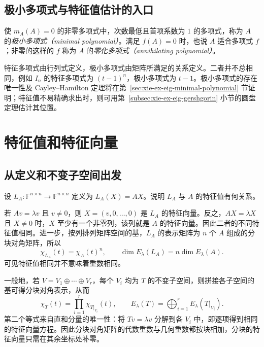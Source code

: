 \subsection{极小多项式与特征值估计的入口}

\begin{definition}
使 $m_A(A)=0$ 的非零多项式中，次数最低且首项系数为 $1$ 的多项式，称为 $A$ 的\emph{极小多项式（minimal polynomial）}。满足 $f(A)=0$ 时，也说 $A$ 适合多项式 $f$；非零的这样的 $f$ 称为 $A$ 的\emph{零化多项式（annihilating polynomial）}。
\end{definition}

特征多项式由行列式定义，极小多项式由矩阵所满足的关系定义。二者并不总相同，例如 $I_n$ 的特征多项式为 $(t-1)^n$，极小多项式为 $t-1$。极小多项式的存在唯一性及 Cayley--Hamilton 定理将在第~\ref{sec:xie-ex-eig-minimal-polynomial} 节证明；特征值不易精确求出时，则可用第~\ref{subsec:xie-ex-eig-gershgorin} 小节的圆盘定理估计其位置。

\section{特征值和特征向量}
\label{sec:xie-ex-eig-eigen-computation}

\subsection{从定义和不变子空间出发}

\begin{example}
设 $L_A\colon\mathbb F^{n\times n}\to\mathbb F^{n\times n}$ 定义为 $L_A(X)=AX$。说明 $L_A$ 与 $A$ 的特征值有何关系。
\end{example}
\begin{solve}
若 $Av=\lambda v$ 且 $v\ne0$，则 $X=(v,0,\ldots,0)$ 是 $L_A$ 的特征向量。反之，$AX=\lambda X$ 且 $X\ne0$ 时，$X$ 至少有一个非零列，该列就是 $A$ 的特征向量。因此二者的不同特征值相同。进一步，按列排列矩阵空间的基，$L_A$ 的表示矩阵为 $n$ 个 $A$ 组成的分块对角矩阵，所以
\[
\chi_{L_A}(t)=\chi_A(t)^n,\qquad
\dim E_\lambda(L_A)=n\dim E_\lambda(A).
\]
可见特征值相同并不意味着重数相同。
\end{solve}

一般地，若 $V=V_1\oplus\cdots\oplus V_r$，每个 $V_i$ 均为 $T$ 的不变子空间，则拼接各子空间的基可得分块对角表示，从而
\begin{equation}
\chi_T(t)=\prod_{i=1}^r\chi_{T|_{V_i}}(t),\qquad
E_\lambda(T)=\bigoplus_{i=1}^rE_\lambda(T|_{V_i}).
\label{eq:xie-ex-eig-block-eigenspaces}
\end{equation}
第二个等式来自直和分量的唯一性：将 $Tv=\lambda v$ 分解到各 $V_i$ 中，即逐项得到相同的特征向量方程。因此分块对角矩阵的代数重数与几何重数都按块相加，分块的特征向量只需在其余坐标处补零。

